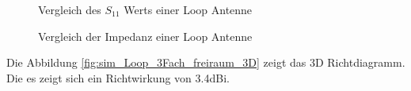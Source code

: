 \begin{figure}[!ht]
	\centering
	\begingroup
	
	\endgroup
	\caption{Vergleich des $S_{11}$ Werts einer Loop Antenne}
	\label{S11_Loop_Vergleich_Simulation}
\end{figure}
\begin{figure}[!ht]
	\centering
	\begingroup
	
	\endgroup
	\caption{Vergleich der Impedanz einer Loop Antenne}
	\label{Impedanz_Loop_Vergleich_Simulation}
\end{figure}


Die Abbildung \ref{fig:sim_Loop_3Fach_freiraum_3D} zeigt das 3D Richtdiagramm. Die es zeigt sich ein Richtwirkung von 3.4dBi.
\newpage
\clearpage
